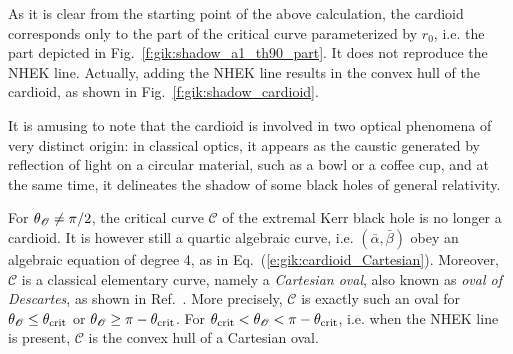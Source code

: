 As it is clear from the starting point of the above calculation, the cardioid corresponds only to the part of the critical curve parameterized by $r_0$, i.e. the part depicted in
Fig.~\ref{f:gik:shadow_a1_th90_part}. It does not reproduce the NHEK line. Actually, adding
the NHEK line results in the convex hull of the cardioid, as shown in Fig.~\ref{f:gik:shadow_cardioid}.

\begin{remark}
It is amusing to note that the cardioid is involved in two optical phenomena of
very distinct origin: in classical optics, it appears as
the caustic generated by reflection of light on a circular material, such as a bowl or
a coffee cup, and at the same time, it delineates the shadow of
some black holes of general relativity.
\end{remark}

\begin{remark}
For $\theta_{\mathscr{O}}\neq \pi/2$, the critical curve $\mathscr{C}$ of the extremal Kerr black hole
is no longer a cardioid. It is however still a quartic algebraic curve,
i.e. $(\bar{\alpha},\bar{\beta})$ obey an algebraic equation of degree 4,
as in Eq.~(\ref{e:gik:cardioid_Cartesian}). Moreover, $\mathscr{C}$ is a classical elementary curve,
namely a \emph{Cartesian oval}, also
known as \emph{oval of Descartes},
as shown in Ref.~\cite{GrallL20c}. More precisely, $\mathscr{C}$ is exactly such an oval
for $\theta_{\mathscr{O}} \leq  \theta_{\rm crit}$ or $\theta_{\mathscr{O}} \geq \pi - \theta_{\rm crit}$.
For $\theta_{\rm crit}  < \theta_{\mathscr{O}} < \pi - \theta_{\rm crit}$, i.e. when the NHEK line is present,
$\mathscr{C}$ is the convex hull of a Cartesian oval.
\end{remark}

